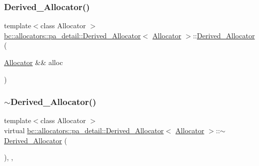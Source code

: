 \mbox{\label{structbc_1_1allocators_1_1pa__detail_1_1Derived__Allocator_a3b6c03c5af767dd9912c12b7ec8ae18e}} 
\subsubsection{\texorpdfstring{Derived\+\_\+\+Allocator()}{Derived\_Allocator()}\hspace{0.1cm}{\footnotesize\ttfamily [3/3]}}
{\footnotesize\ttfamily template$<$class Allocator $>$ \\
\hyperlink{structbc_1_1allocators_1_1pa__detail_1_1Derived__Allocator}{bc\+::allocators\+::pa\+\_\+detail\+::\+Derived\+\_\+\+Allocator}$<$ \hyperlink{classbc_1_1allocators_1_1Allocator}{Allocator} $>$\+::\hyperlink{structbc_1_1allocators_1_1pa__detail_1_1Derived__Allocator}{Derived\+\_\+\+Allocator} (\begin{DoxyParamCaption}\item[{\hyperlink{classbc_1_1allocators_1_1Allocator}{Allocator} \&\&}]{alloc }\end{DoxyParamCaption})\hspace{0.3cm}{\ttfamily [inline]}}

\mbox{\label{structbc_1_1allocators_1_1pa__detail_1_1Derived__Allocator_a4640d317cab7d3bcd42fe5b975551dc1}} 
\subsubsection{\texorpdfstring{$\sim$\+Derived\+\_\+\+Allocator()}{~Derived\_Allocator()}}
{\footnotesize\ttfamily template$<$class Allocator $>$ \\
virtual \hyperlink{structbc_1_1allocators_1_1pa__detail_1_1Derived__Allocator}{bc\+::allocators\+::pa\+\_\+detail\+::\+Derived\+\_\+\+Allocator}$<$ \hyperlink{classbc_1_1allocators_1_1Allocator}{Allocator} $>$\+::$\sim$\hyperlink{structbc_1_1allocators_1_1pa__detail_1_1Derived__Allocator}{Derived\+\_\+\+Allocator} (\begin{DoxyParamCaption}{ }\end{DoxyParamCaption})\hspace{0.3cm}{\ttfamily [inline]}, {\ttfamily [override]}, {\ttfamily [virtual]}}



